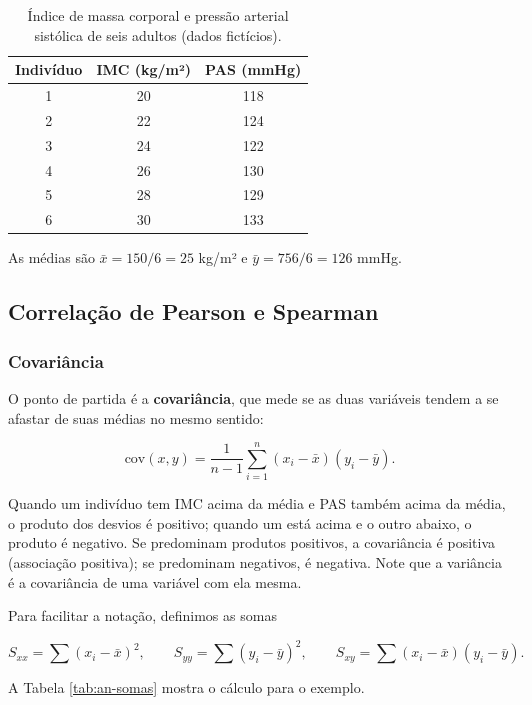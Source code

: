 \documentclass[
]{book}
\begin{document}
\begin{table}

\caption{\label{tab:an-dados-ex}Índice de massa corporal e pressão arterial sistólica de seis adultos (dados fictícios).}
\centering
\begin{tabular}[t]{c|c|c}
\hline
Indivíduo & IMC (kg/m²) & PAS (mmHg)\\
\hline
1 & 20 & 118\\
\hline
2 & 22 & 124\\
\hline
3 & 24 & 122\\
\hline
4 & 26 & 130\\
\hline
5 & 28 & 129\\
\hline
6 & 30 & 133\\
\hline
\end{tabular}
\end{table}

As médias são \(\bar{x} = 150/6 = 25\) kg/m² e \(\bar{y} = 756/6 = 126\) mmHg.

\subsection{Correlação de Pearson e Spearman}\label{correlauxe7uxe3o-de-pearson-e-spearman}

\subsubsection{Covariância}\label{covariuxe2ncia}

O ponto de partida é a \textbf{covariância}, que mede se as duas variáveis tendem a se afastar de suas médias no mesmo sentido:

\[
\text{cov}(x, y) = \frac{1}{n-1}\sum_{i=1}^{n}(x_i - \bar{x})(y_i - \bar{y}).
\]

Quando um indivíduo tem IMC acima da média e PAS também acima da média, o produto dos desvios é positivo; quando um está acima e o outro abaixo, o produto é negativo. Se predominam produtos positivos, a covariância é positiva (associação positiva); se predominam negativos, é negativa. Note que a variância é a covariância de uma variável com ela mesma.

Para facilitar a notação, definimos as somas

\[
S_{xx} = \sum (x_i - \bar{x})^2, \qquad S_{yy} = \sum (y_i - \bar{y})^2, \qquad S_{xy} = \sum (x_i - \bar{x})(y_i - \bar{y}).
\]

A Tabela \ref{tab:an-somas} mostra o cálculo para o exemplo.
\end{document}
